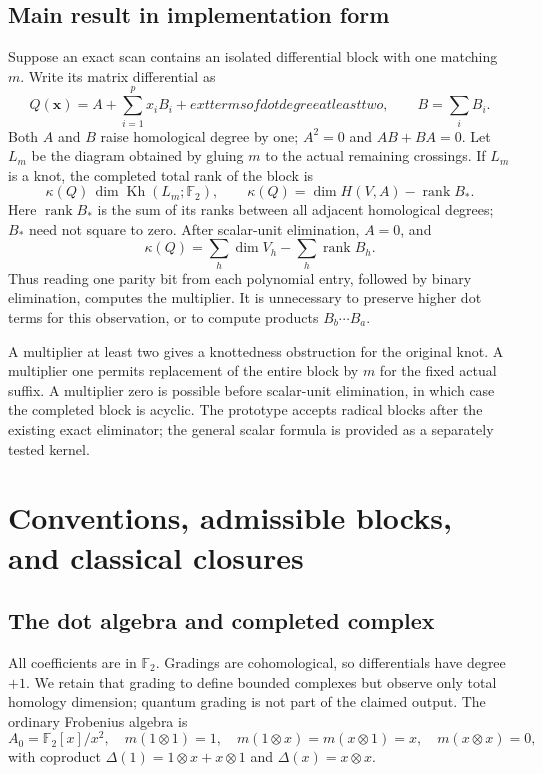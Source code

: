 \documentclass[11pt]{article}
\theoremstyle{definition}\newtheorem{definition}[theorem]{Definition}\newtheorem{example}[theorem]{Example}
\theoremstyle{remark}\newtheorem{remark}[theorem]{Remark}
\newcommand{\F}{{\mathbb{F}_2}}
\newcommand{\rk}{\operatorname{rank}}
\newcommand{\Kh}{\operatorname{Kh}}
\begin{document}
\subsection{Main result in implementation form}
Suppose an exact scan contains an isolated differential block with one matching $m$. Write its matrix differential as
\begin{equation}\label{eq:firstjet}
 Q(\boldsymbol x)=A+\sum_{i=1}^p x_i B_i+	ext{terms of dot degree at least two},
 \qquad B=\sum_iB_i.
\end{equation}
Both $A$ and $B$ raise homological degree by one; $A^2=0$ and $AB+BA=0$. Let $L_m$ be the diagram obtained by gluing $m$ to the actual remaining crossings. If $L_m$ is a knot, the completed total rank of the block is
\begin{equation}\label{eq:introjet}
 \kappa(Q)\,\dim\Kh(L_m;\F),\qquad
 \kappa(Q)=\dim H(V,A)-\rk B_*.
\end{equation}
Here $\rk B_*$ is the sum of its ranks between all adjacent homological degrees; $B_*$ need not square to zero. After scalar-unit elimination, $A=0$, and
\begin{equation}\label{eq:kappa}
 \kappa(Q)=\sum_h\dim V_h-\sum_h\rk B_h.
\end{equation}
Thus reading one parity bit from each polynomial entry, followed by binary elimination, computes the multiplier. It is unnecessary to preserve higher dot terms for this observation, or to compute products $B_b\cdots B_a$.

A multiplier at least two gives a knottedness obstruction for the original knot. A multiplier one permits replacement of the entire block by $m$ for the fixed actual suffix. A multiplier zero is possible before scalar-unit elimination, in which case the completed block is acyclic. The prototype accepts radical blocks after the existing exact eliminator; the general scalar formula is provided as a separately tested kernel.

\section{Conventions, admissible blocks, and classical closures}
\subsection{The dot algebra and completed complex}
All coefficients are in $\F$. Gradings are cohomological, so differentials have degree $+1$. We retain that grading to define bounded complexes but observe only total homology dimension; quantum grading is not part of the claimed output. The ordinary Frobenius algebra is
\[
 A_0=\F[x]/x^2,
 \quad m(1\otimes1)=1,\quad m(1\otimes x)=m(x\otimes1)=x,
 \quad m(x\otimes x)=0,
\]
with coproduct $\Delta(1)=1\otimes x+x\otimes1$ and $\Delta(x)=x\otimes x$.
\end{document}

